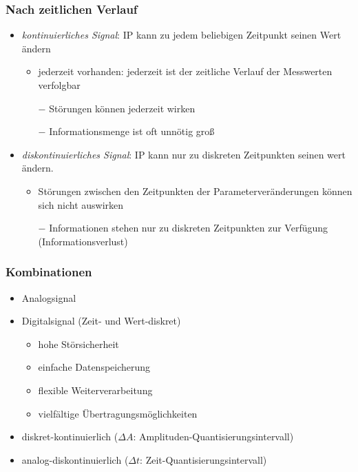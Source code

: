 \documentclass{scrreprt}
\begin{document}
\subsubsection{Nach zeitlichen Verlauf}
\begin{itemize}
\item \emph{kontinuierliches Signal}: IP kann zu jedem beliebigen Zeitpunkt seinen Wert ändern
\begin{itemize}[label=$+$]
\item jederzeit vorhanden: jederzeit ist der zeitliche Verlauf der Messwerten verfolgbar
\item[$-$] Störungen können jederzeit wirken
\item[$-$] Informationsmenge ist oft unnötig groß
\end{itemize}
\item \emph{diskontinuierliches Signal}: IP kann nur zu diskreten Zeitpunkten seinen wert ändern.
\begin{itemize}[label=$+$]
\item Störungen zwischen den Zeitpunkten der Parameterveränderungen können sich nicht auswirken
\item[$-$] Informationen stehen nur zu diskreten Zeitpunkten zur Verfügung (Informationsverlust)
\end{itemize}
\end{itemize}
\subsubsection{Kombinationen}
\begin{itemize}
\item Analogsignal
\item Digitalsignal (Zeit- und Wert-diskret)
\begin{itemize}[label=$+$]
\item hohe Störsicherheit
\item einfache Datenspeicherung
\item flexible Weiterverarbeitung
\item vielfältige Übertragungsmöglichkeiten
\end{itemize}
\item diskret-kontinuierlich ($\Delta A$: Amplituden-Quantisierungsintervall)
\item analog-diskontinuierlich ($\Delta t$: Zeit-Quantisierungsintervall)
\end{itemize}
\end{document}
